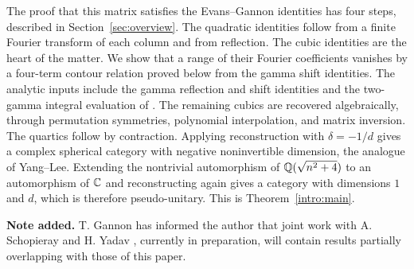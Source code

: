 The proof that this matrix satisfies the Evans--Gannon identities has
four steps, described in Section~\ref{sec:overview}. The quadratic
identities follow from a finite Fourier transform of each column and
from reflection. The cubic identities are the heart of the matter.
We show that a range of their Fourier coefficients vanishes by a
four-term contour relation proved below from the gamma shift identities.
The analytic inputs include the gamma reflection and shift identities
and the two-gamma integral evaluation of \cite{BSS}. The remaining cubics
are recovered algebraically, through permutation symmetries, polynomial
interpolation, and matrix inversion. The quartics follow by contraction.
Applying reconstruction with $\delta=-1/d$ gives a complex spherical
category with negative noninvertible dimension, the analogue of
Yang--Lee. Extending the nontrivial automorphism of $\mathbb Q(\sqrt{n^2+4})$
to an automorphism of $\mathbb C$ and reconstructing again gives a category with
dimensions $1$ and $d$, which is therefore pseudo-unitary. This is
Theorem~\ref{intro:main}.



\medskip
\noindent\textbf{Note added.}
T. Gannon has informed the author that joint work with A. Schopieray
and H. Yadav \cite{GSY1}, currently in preparation, will contain results
partially overlapping with those of this paper.
